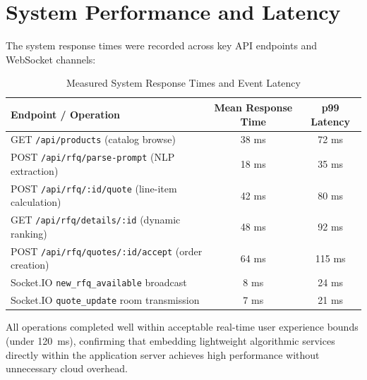 \section{System Performance and Latency}

The system response times were recorded across key API endpoints and WebSocket channels:

\begin{table}[H]
\centering
\caption{Measured System Response Times and Event Latency}
\label{tab:latency_benchmarks}
\begin{tabular}{p{7.2cm} c c}
\toprule
\textbf{Endpoint / Operation} & \textbf{Mean Response Time} & \textbf{p99 Latency} \\
\midrule
GET \texttt{/api/products} (catalog browse) & 38 ms & 72 ms \\
POST \texttt{/api/rfq/parse-prompt} (NLP extraction) & 18 ms & 35 ms \\
POST \texttt{/api/rfq/:id/quote} (line-item calculation) & 42 ms & 80 ms \\
GET \texttt{/api/rfq/details/:id} (dynamic ranking) & 48 ms & 92 ms \\
POST \texttt{/api/rfq/quotes/:id/accept} (order creation) & 64 ms & 115 ms \\
Socket.IO \texttt{new\_rfq\_available} broadcast & 8 ms & 24 ms \\
Socket.IO \texttt{quote\_update} room transmission & 7 ms & 21 ms \\
\bottomrule
\end{tabular}
\end{table}

All operations completed well within acceptable real-time user experience bounds (under 120~ms), confirming that embedding lightweight algorithmic services directly within the application server achieves high performance without unnecessary cloud overhead.

